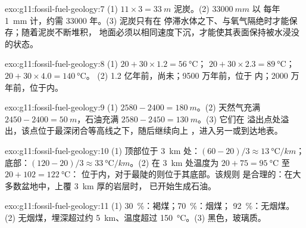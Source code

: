 \begin{solution}{exo:g11:fossil-fuel-geology:7}
(1) $11 \times 3 = \qty{33}{m}$ 泥炭。(2) $\qty{33000}{mm}$ 以
每年 \qty{1}{mm} 计，约需 \num{33000} 年。(3) 泥炭只有在
停滞水体之下、与氧气隔绝时才能保存；随着泥炭不断堆积，
地面必须以相同速度下沉，才能使其表面保持被水浸没的状态。
\end{solution}

\begin{solution}{exo:g11:fossil-fuel-geology:8}
(1) $20 + 30 \times 1.2 = \qty{56}{\degreeCelsius}$；
$20 + 30 \times 2.3 = \qty{89}{\degreeCelsius}$；
$20 + 30 \times 4.0 = \qty{140}{\degreeCelsius}$。
(2) 1.2 亿年前，尚未；9500 万年前，位于
内；2000 万年前，位于内。
\end{solution}

\begin{solution}{exo:g11:fossil-fuel-geology:9}
(1) $2580 - 2400 = \qty{180}{m}$。(2) 天然气充满
$2450 - 2400 = \qty{50}{m}$，石油充满 $2580 - 2450 = \qty{130}{m}$。(3) 它们在
溢出点处溢出，该点位于最深闭合等高线之下，随后继续向上
，进入另一或到达地表。
\end{solution}

\begin{solution}{exo:g11:fossil-fuel-geology:10}
(1) 顶部位于 \qty{3}{km} 处：$(60 - 20)/3 \approx
\qty{13}{\degreeCelsius/km}$；底部：$(120 - 20)/3 \approx
\qty{33}{\degreeCelsius/km}$。(2) 在 \qty{3}{km} 处温度为
$20 + 75 = \qty{95}{\degreeCelsius}$ 至 $20 + 102 = \qty{122}{\degreeCelsius}$：
位于内，对于最陡的则位于其底部。该规则
是合理的：在大多数盆地中，上覆 \qty{3}{km} 厚的岩层时，
已开始生成石油。
\end{solution}

\begin{solution}{exo:g11:fossil-fuel-geology:11}
(1) \qty{30}{\percent}：褐煤；\qty{70}{\percent}：烟煤；
\qty{92}{\percent}：无烟煤。(2) 无烟煤，埋深超过约
\qty{5}{km}、温度超过 \qty{150}{\degreeCelsius}。(3) 黑色，玻璃质。
\end{solution}

